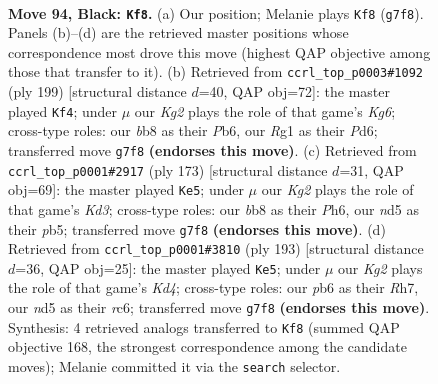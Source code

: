 \documentclass[11pt]{article}
\begin{document}
\clearpage

\begin{figure}[p]\centering
\begin{subfigure}{0.46\textwidth}\centering
\resizebox{\linewidth}{!}{%
\newchessgame
\chessboard[
  setfen={1B6/6kR/1P6/3N4/P3B1b1/1K5p/8/6r1 b - - 10 94},
  showmover=false,
  pgfstyle=straightmove, color=movearrow, markmove={g7-f8}
]}
\caption{}
\end{subfigure}\hfill
\begin{subfigure}{0.46\textwidth}\centering
\resizebox{\linewidth}{!}{%
\newchessgame
\chessboard[
  setfen={8/8/1p1p4/1P1Bn3/1bP5/6k1/6R1/3K4 b - - 76 100},
  showmover=false,
  pgfstyle=straightmove, color=movearrow, markmove={g3-f4}
]}
\caption{}
\end{subfigure}
\\[4pt]
\begin{subfigure}{0.46\textwidth}\centering
\resizebox{\linewidth}{!}{%
\newchessgame
\chessboard[
  setfen={8/6p1/2Rk3p/1P5b/1K6/3B4/8/r7 b - - 1 87},
  showmover=false,
  pgfstyle=straightmove, color=movearrow, markmove={d6-e5}
]}
\caption{}
\end{subfigure}\hfill
\begin{subfigure}{0.46\textwidth}\centering
\resizebox{\linewidth}{!}{%
\newchessgame
\chessboard[
  setfen={8/7r/2R5/pB1k1p2/P7/5K2/3R4/r7 b - - 36 97},
  showmover=false,
  pgfstyle=straightmove, color=movearrow, markmove={d5-e5}
]}
\caption{}
\end{subfigure}
\caption{\textbf{Move 94, Black: \texttt{Kf8}.} (a) Our position; Melanie plays \texttt{Kf8} (\texttt{g7f8}). Panels (b)--(d) are the retrieved master positions whose correspondence most drove this move (highest QAP objective among those that transfer to it). (b) Retrieved from \texttt{ccrl\_top\_p0003\#1092} (ply 199) [structural distance $d$=40, QAP obj=72]: the master played \texttt{Kf4}; under $\mu$ our \emph{Kg2} plays the role of that game's \emph{Kg6}; cross-type roles: our \emph{b}b8 as their \emph{P}b6, our \emph{R}g1 as their \emph{P}d6; transferred move \texttt{g7f8} \textbf{(endorses this move)}. (c) Retrieved from \texttt{ccrl\_top\_p0001\#2917} (ply 173) [structural distance $d$=31, QAP obj=69]: the master played \texttt{Ke5}; under $\mu$ our \emph{Kg2} plays the role of that game's \emph{Kd3}; cross-type roles: our \emph{b}b8 as their \emph{P}h6, our \emph{n}d5 as their \emph{p}b5; transferred move \texttt{g7f8} \textbf{(endorses this move)}. (d) Retrieved from \texttt{ccrl\_top\_p0001\#3810} (ply 193) [structural distance $d$=36, QAP obj=25]: the master played \texttt{Ke5}; under $\mu$ our \emph{Kg2} plays the role of that game's \emph{Kd4}; cross-type roles: our \emph{p}b6 as their \emph{R}h7, our \emph{n}d5 as their \emph{r}c6; transferred move \texttt{g7f8} \textbf{(endorses this move)}. Synthesis: 4 retrieved analogs transferred to \texttt{Kf8} (summed QAP objective 168, the strongest correspondence among the candidate moves); Melanie committed it via the \texttt{search} selector.}
\label{fig:thought-m187}
\end{figure}
\end{document}
